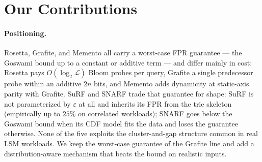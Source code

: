 \section{Our Contributions}
\label{sec:our-contributions}

\paragraph{Positioning.}
Rosetta, Grafite, and Memento all carry a worst-case FPR guarantee ---
the Goswami bound up to a constant or additive term --- and differ
mainly in cost: Rosetta pays $O(\log_2 \mathcal{L})$ Bloom probes per
query, Grafite a single predecessor probe within an additive $2n$ bits,
and Memento adds dynamicity at static-axis parity with Grafite.
SuRF and SNARF trade that guarantee for shape: SuRF is not
parameterized by $\varepsilon$ at all and inherits its FPR from the
trie skeleton (empirically up to $25\%$ on correlated workloads);
SNARF goes below the Goswami bound when its CDF model fits the data
and loses the guarantee otherwise.
None of the five exploits the cluster-and-gap structure common in real
LSM workloads.
We keep the worst-case guarantee of the Grafite line and add a
distribution-aware mechanism that beats the bound on realistic inputs.


